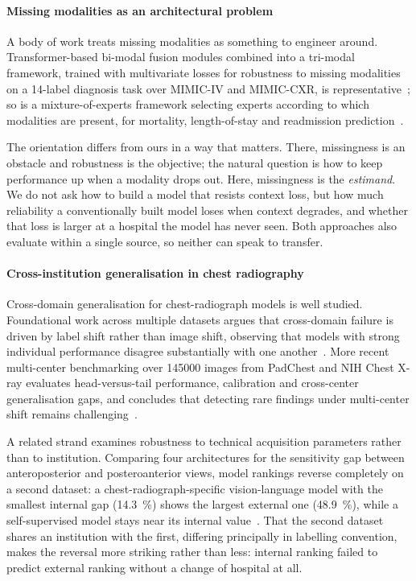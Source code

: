\paragraph{Missing modalities as an architectural problem}

A body of work treats missing modalities as something to engineer around.
Transformer-based bi-modal fusion modules combined into a tri-modal framework,
trained with multivariate losses for robustness to missing modalities on a
14-label diagnosis task over MIMIC-IV and MIMIC-CXR, is
representative~\cite{wang2025missing}; so is a mixture-of-experts framework
selecting experts according to which modalities are present, for mortality,
length-of-stay and readmission prediction~\cite{wang2025moehealth}.

The orientation differs from ours in a way that matters. There, missingness is
an obstacle and robustness is the objective; the natural question is how to keep
performance up when a modality drops out. Here, missingness is the
\emph{estimand}. We do not ask how to build a model that resists context loss,
but how much reliability a conventionally built model loses when context
degrades, and whether that loss is larger at a hospital the model has never
seen. Both approaches also evaluate within a single source, so neither can speak
to transfer.

\paragraph{Cross-institution generalisation in chest radiography}

Cross-domain generalisation for chest-radiograph models is well studied.
Foundational work across multiple datasets argues that cross-domain failure is
driven by label shift rather than image shift, observing that models with strong
individual performance disagree substantially with one
another~\cite{cohen2020limits}. More recent multi-center benchmarking over
\num{145000} images from PadChest and NIH Chest X-ray evaluates head-versus-tail
performance, calibration and cross-center generalisation gaps, and concludes
that detecting rare findings under multi-center shift remains
challenging~\cite{cxrlt2026}.

A related strand examines robustness to technical acquisition parameters rather
than to institution. Comparing four architectures for the sensitivity gap
between anteroposterior and posteroanterior views, model rankings reverse
completely on a second dataset: a chest-radiograph-specific vision-language
model with the smallest internal gap (\SI{14.3}{\percent}) shows the largest
external one (\SI{48.9}{\percent}), while a self-supervised model stays near
its internal value~\cite{farquhar2026acquisition}. That the second dataset
shares an institution with the first, differing principally in labelling
convention, makes the reversal more striking rather than less: internal ranking
failed to predict external ranking without a change of hospital at all.


